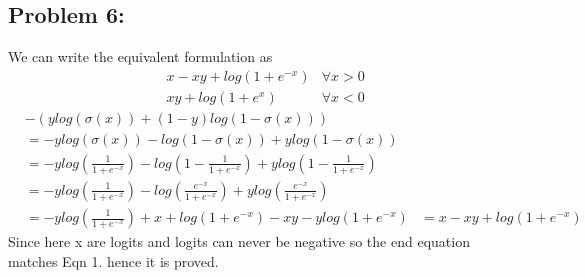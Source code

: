\documentclass[5pt,a4paper]{article}
\begin{document}
	\subsection*{Problem 6:}
	We can write the equivalent formulation as
	\begin{eqnarray}
		&x-xy+log(1+e^{-x})&\forall x>0\\
		&xy+log(1+e^{x})&\forall x<0
	\end{eqnarray}
	\begin{eqnarray*}
	&-(y log(\sigma(x))+(1-y)log(1-\sigma(x)))\\
	&=-y log(\sigma(x))-log(1-\sigma(x))+y log(1-\sigma(x))\\
	&=-y log(\frac{1}{1+e^{-x}})-log(1-\frac{1}{1+e^{-x}})+y log(1-\frac{1}{1+e^{-x}})\\
	&=-y log(\frac{1}{1+e^{-x}})-log(\frac{e^{-x}}{1+e^{-x}})+ylog(\frac{e^{-x}}{1+e^{-x}})\\
	&=-y log(\frac{1}{1+e^{-x}})+x+log(1+e^{-x})-xy-ylog(1+e^{-x})
	&=x-xy+log(1+e^{-x})
	\end{eqnarray*}
	Since here x are logits and logits can never be negative so the end equation matches Eqn 1. hence it is proved.
\end{document}
